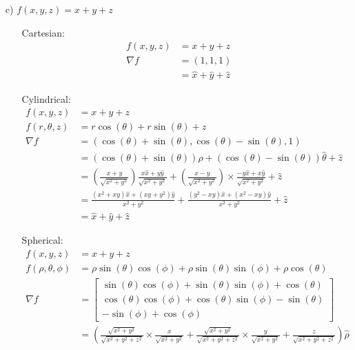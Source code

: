 \documentclass{article}
\begin{document}
\begin{itemize}
\begin{itemize}
        \newpage
        \item [c)] \(f(x,y,z)=x+y+z\)
        \begin{itemize}
            \item [Cartesian:] 
            \begin{align*}
                f(x,y,z)&=x+y+z\\
                \nabla f &=(1,1,1)\\
                &= \hat x+\hat y + \hat z
            \end{align*}
            \item [Cylindrical:]
            \begin{align*}
                f(x,y,z)&=x+y+z\\
                f(r,\theta,z)&=r\cos(\theta)+r\sin(\theta)+z\\
                \nabla f &=\left(\cos(\theta)+\sin(\theta),\cos(\theta)-\sin(\theta),1\right)\\
                &=(\cos(\theta)+\sin(\theta))\hat{\rho}+(\cos(\theta)-\sin(\theta))\hat{\theta}+\hat{z}\\
                &=\left(\frac{x+y}{\sqrt{x^2+y^2}}\right)\frac{x\hat{x}+y\hat{y}}{\sqrt{x^2+y^2}}+\left(\frac{x-y}{\sqrt{x^2+y^2}}\right)\times\frac{-y\hat{x}+x\hat{y}}{\sqrt{x^2+y^2}}+\hat{z}\\
                &=\frac{(x^2+xy)\hat x+(xy+y^2)\hat y}{x^2+y^2}+\frac{(y^2-xy)\hat x+(x^2-xy)\hat y}{x^2+y^2}+\hat z\\
                &=\hat x + \hat y + \hat z
            \end{align*}
            \item [Spherical:]
            \begin{align*}
                f(x,y,z)&=x+y+z\\
                f(\rho,\theta,\phi) &=\rho\sin(\theta)\cos(\phi)+\rho\sin(\theta)\sin(\phi)+\rho\cos(\theta)\\
                \nabla f &=\begin{bmatrix}
                    \sin(\theta)\cos(\phi)+\sin(\theta)\sin(\phi)+\cos(\theta)\\
                    \cos(\theta)\cos(\phi)+\cos(\theta)\sin(\phi)-\sin(\theta)\\
                    -\sin(\phi)+\cos(\phi)
                \end{bmatrix}\\
                &=\left(\frac{\sqrt{x^2+y^2}}{\sqrt{x^2+y^2+z^2}}\times \frac{x}{\sqrt{x^2+y^2}}+\frac{\sqrt{x^2+y^2}}{\sqrt{x^2+y^2+z^2}}\times \frac{y}{\sqrt{x^2+y^2}}+\frac{z}{\sqrt{x^2+y^2+z^2}}\right) \hat \rho\\

\end{align*}
\end{itemize}
\end{itemize}
\end{itemize}
\end{document}
